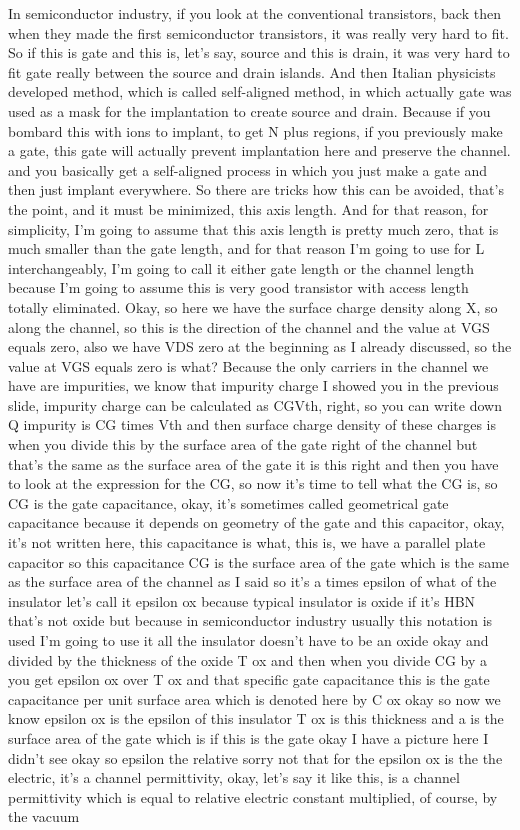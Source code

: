 In semiconductor industry, if you look at the conventional transistors, back then when they made the first semiconductor transistors, it was really very hard to fit. So if this is gate and this is, let's say, source and this is drain, it was very hard to fit gate really between the source and drain islands. And then Italian physicists developed method, which is called self-aligned method, in which actually gate was used as a mask for the implantation to create source and drain. Because if you bombard this with ions to implant, to get N plus regions, if you previously make a gate, this gate will actually prevent implantation here and preserve the channel. and you basically get a self-aligned process in which you just make a gate and then just implant everywhere. So there are tricks how this can be avoided, that's the point, and it must be minimized, this axis length. And for that reason, for simplicity, I'm going to assume that this axis length is pretty much zero, that is much smaller than the gate length, and for that reason I'm going to use for L interchangeably, I'm going to call it either gate length or the channel length because I'm going to assume this is very good transistor with access length totally eliminated. Okay, so here we have the surface charge density along X, so along the channel, so this is the direction of the channel and the value at VGS equals zero, also we have VDS zero at the beginning as I already discussed, so the value at VGS equals zero is what? Because the only carriers in the channel we have are impurities, we know that impurity charge I showed you in the previous slide, impurity charge can be calculated as CGVth, right, so you can write down Q impurity is CG times Vth and then surface charge density of these charges is when you divide this by the surface area of the gate right of the channel but that's the same as the surface area of the gate it is this right and then you have to look at the expression for the CG, so now it's time to tell what the CG is, so CG is the gate capacitance, okay, it's sometimes called geometrical gate capacitance because it depends on geometry of the gate and this capacitor, okay, it's not written here, this capacitance is what, this is, we have a parallel plate capacitor so this capacitance CG is the surface area of the gate which is the same as the surface area of the channel as I said so it's a times epsilon of what of the insulator let's call it epsilon ox because typical insulator is oxide if it's HBN that's not oxide but because in semiconductor industry usually this notation is used I'm going to use it all the insulator doesn't have to be an oxide okay and divided by the thickness of the oxide T ox and then when you divide CG by a you get epsilon ox over T ox and that specific gate capacitance this is the gate capacitance per unit surface area which is denoted here by C ox okay so now we know epsilon ox is the epsilon of this insulator T ox is this thickness and a is the surface area of the gate which is if this is the gate okay I have a picture here I didn't see okay so epsilon the relative sorry not that for the epsilon ox is the the electric, it's a channel permittivity, okay, let's say it like this, is a channel permittivity which is equal to relative electric constant multiplied, of course, by the vacuum 
